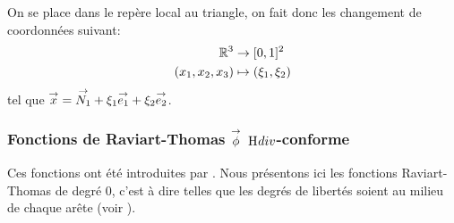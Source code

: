     \newcommand{\ncouche}{6}
    \newcommand{\setnodes}[6]{
        \renewcommand{\xa}{#1}
        \renewcommand{\ya}{#2}
        \renewcommand{\xb}{#3}
        \renewcommand{\yb}{#4}
        \renewcommand{\xc}{#5}
        \renewcommand{\yc}{#6}
    }
    \newcommand{\xa}{0.0}
    \newcommand{\ya}{0.0}
    \newcommand{\xb}{3.0}
    \newcommand{\yb}{0.0}
    \newcommand{\xc}{0.0}
    \newcommand{\yc}{3.0}
    \begin{minipage}{0.45\textwidth}
      \begin{center}
        \begin{tikzpicture}[scale=1]
          
        \end{tikzpicture}
      \end{center}
      \label{fig:form_int:fon_base:tri}
    \end{minipage}
    \begin{minipage}{0.54\textwidth}
     On se place dans le repère local au triangle, on fait donc les changement de coordonnées suivant:
    \begin{align*}
      \RR^3 &\rightarrow [0,1]^2 \\
      (x_1,x_2,x_3) & \mapsto (\xi_1,\xi_2)
    \end{align*}
      tel que \(\vx =\vect{N_1}+ \xi_1 \vect{e_1} + \xi_2 \vect{e_2}\).
    \end{minipage}

    \subsubsection[Fonctions de Raviart-Thomas phi Hdiv-conforme]{Fonctions de Raviart-Thomas \(\vect{\phi}\) \(\Hdiv\)-conforme}

      Ces fonctions ont été introduites par \cite{raviart_mixed_1977}. Nous présentons ici les fonctions Raviart-Thomas de degré 0, c'est à dire telles que les degrés de libertés soient au milieu de chaque arête (voir \cite[eq.~(3.10)]{raviart_mixed_1977}).

